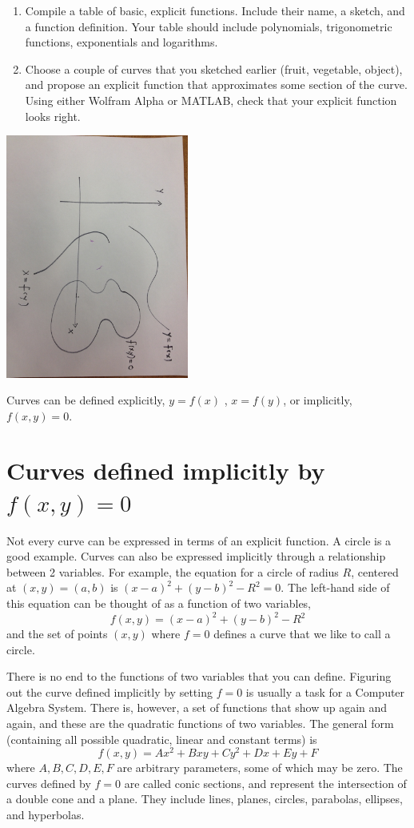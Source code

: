 \documentclass{tufte-handout}
\begin{document}
\begin{enumerate}[resume]
\item Compile a table of basic, explicit functions. Include their name, a sketch, and a function definition. Your table should include polynomials, trigonometric functions, exponentials and logarithms.
\item Choose a couple of curves that you sketched earlier (fruit, vegetable, object), and propose an explicit function that approximates some section of the curve.  Using either Wolfram Alpha or MATLAB, check that your explicit function looks right.
\end{enumerate}

\begin{marginfigure}
\includegraphics[width=6cm]{figs/curves}
\caption{Curves can be defined explicitly, $y = f(x)$ , $x = f(y)$, or implicitly, $f(x,y)=0$.}
\end{marginfigure}

\section{Curves defined implicitly by $f(x,y)=0$}

Not every curve can be expressed in terms of an explicit function. A circle is a good example. Curves can also be expressed implicitly through a relationship between 2 variables. For example, the equation for a circle of radius $R$, centered at $(x,y)=(a,b)$ is $(x-a)^2 + (y-b)^2 - R^2 = 0$. The left-hand side of this equation can be thought of as a function of two variables,
\[f(x,y) = (x-a)^2 + (y-b)^2 - R^2 \]
and the set of points $(x,y)$ where $f=0$ defines a curve that we like to call a circle.

There is no end to the functions of two variables that you can define. Figuring out the curve defined implicitly by setting $f=0$ is usually a task for a Computer Algebra System. There is, however, a set of functions that show up again and again, and these are the quadratic functions of two variables. The general form (containing all possible quadratic, linear and constant terms) is
\[f(x,y) = Ax^2 + Bxy + Cy^2 + Dx + Ey + F\]
where $A,B,C,D,E,F$ are arbitrary parameters, some of which may be zero. The curves defined by $f=0$ are called conic sections, and represent the intersection of a double cone and a plane. They include lines, planes, circles, parabolas, ellipses, and hyperbolas.
\end{document}
